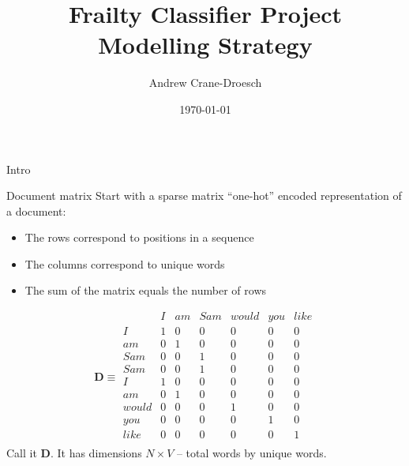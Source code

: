 \documentclass[10pt]{beamer}
\title{Frailty Classifier Project \\ Modelling Strategy}
\author{Andrew Crane-Droesch}
\date{\today}
\begin{document}
    \begin{frame}
    \titlepage
    \end{frame}


\begin{frame}
Intro
\end{frame}

\begin{frame}{Document matrix}
Start with a sparse matrix ``one-hot'' encoded representation of a document:
\begin{itemize}
	\item The rows correspond to positions in a sequence
	\item The columns correspond to unique words
	\item The sum of the matrix equals the number of rows
\end{itemize}
\[  \bm{D} \equiv
\begin{array}{c|cccccc}
     & I & am & Sam & would & you & like \\
     \hline
I    & 1 & 0  & 0   & 0     & 0   &  0 \\
am   & 0 & 1  & 0   & 0     & 0   &  0 \\
Sam  & 0 & 0  & 1   & 0     & 0   &  0 \\
Sam  & 0 & 0  & 1   & 0     & 0   &  0 \\
I    & 1 & 0  & 0   & 0     & 0   &  0 \\
am   & 0 & 1  & 0   & 0     & 0   &  0 \\
would& 0 & 0  & 0   & 1     & 0   &  0 \\
you  & 0 & 0  & 0   & 0     & 1   &  0 \\
like & 0 & 0  & 0   & 0     & 0   &  1 \\
\end{array}\] 
Call it $\bm{D}$.  It has dimensions $N\times V$ -- total words by unique words.
\end{frame}
\end{document}
